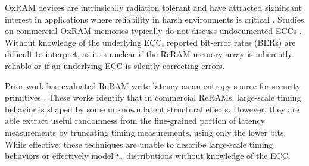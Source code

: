 

OxRAM devices are intrinsically radiation tolerant \cite{marinella2021radiation} and have attracted significant interest in applications where reliability in harsh environments is critical \cite{yang2014reliability, chen2014single, bi2019total, lyu2021research, korkian2022single}. Studies on commercial OxRAM memories typically do not discuss undocumented ECCs \cite{yang2014reliability, bi2019total, korkian2022single}. Without knowledge of the underlying ECC, reported bit-error rates (BERs) are difficult to interpret, as it is unclear if the ReRAM memory array is inherently reliable or if an underlying ECC is silently correcting errors. 

Prior work has evaluated ReRAM write latency as an entropy source for security primitives \cite{tolga2024trng, suri2018high}. These works identify that in commercial ReRAMs, large-scale timing behavior is shaped by some unknown latent structural effects. However, they are able extract useful randomness from the fine-grained portion of latency measurements by truncating timing measurements, using only the lower bits. While effective, these techniques are unable to describe large-scale timing behaviors or effectively model $t_w$ distributions without knowledge of the ECC.

